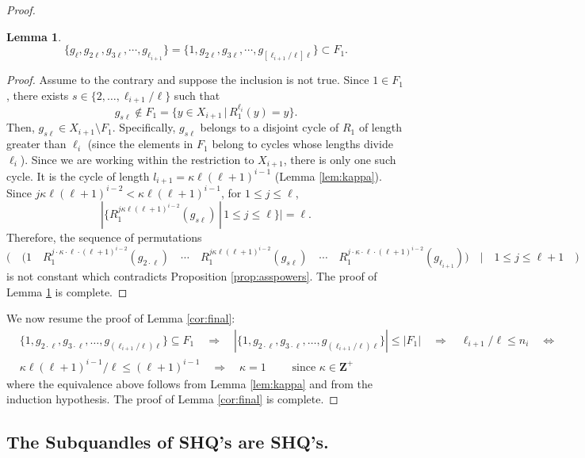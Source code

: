 \documentclass{article}
\newtheorem{lemma}[theorem]{Lemma}
\begin{document}
\begin{proof}
\begin{lemma}\label{lem:GF1}
$$\{ g_{\ell}, g_{2\ell}, g_{3\ell}, \cdots  , g_{\ell_{i+1}}  \} = \{ 1, g_{2\ell}, g_{3\ell}, \cdots , g_{[\ell_{i+1}/\ell]\ell}\}\subset F_1 .$$
\end{lemma}
\begin{proof}
Assume to the contrary and suppose the inclusion is not true. Since $1\in F_1$, there exists $s\in \{ 2, \dots , \ell_{i+1}/\ell \}$ such that $$g_{s\ell}\notin F_1=\{ y\in X_{i+1}\,|\, R_1^{\ell_i}(y)=y \} .$$ Then, $g_{s\ell}\in X_{i+1}\setminus F_1$. Specifically, $g_{s\ell}$ belongs to a disjoint cycle of $R_1$ of length greater than $\ell_i$ (since the elements in $F_1$ belong to cycles whose lengths divide $\ell_i$). Since we are working within the restriction to $X_{i+1}$, there is only one such cycle. It is the cycle of length $l_{i+1}=\kappa \ell (\ell+1)^{i-1}$ (Lemma \ref{lem:kappa}). Since $j\kappa \ell(\ell +1)^{i-2}< \kappa\ell(\ell +1)^{i-1}$, for $1\leq j \leq \ell$, $$|\{ R_1^{j\kappa \ell(\ell +1)^{i-2}}(g_{s\ell})\, |\, 1\leq j \leq \ell \}|=\ell .$$  Therefore, the sequence of permutations $$\Bigg(\quad  \bigg(1\quad R_1^{j\cdot\kappa\cdot\ell\cdot(\ell+1)^{i-2}}(g_{2\cdot\ell})\quad\cdots\quad R_1^{j\kappa \ell(\ell +1)^{i-2}}(g_{s\ell})\quad\cdots\quad R_1^{j\cdot\kappa\cdot\ell\cdot(\ell+1)^{i-2}}(g_{\ell_{i+1}})\bigg)\quad |\quad 1\leq j \leq \ell+1 \quad\Bigg) $$ is not constant which contradicts Proposition \ref{prop:asspowers}. The proof of Lemma \ref{lem:GF1} is complete.

\end{proof}
We now resume the proof of Lemma \ref{cor:final}: \begin{align*}
&\{1,g_{2\cdot\ell},g_{3\cdot\ell},\dots,g_{(\ell_{i+1}/\ell)\ell}\}\subseteq F_1 \quad \Longrightarrow \quad |\{1,g_{2\cdot\ell},g_{3\cdot\ell},\dots,g_{(\ell_{i+1}/\ell)\ell}\}|\leq |F_1| \quad \Longrightarrow \quad \ell_{i+1}/\ell \leq n_i \quad \Longleftrightarrow \quad \\
&\kappa \ell(\ell+1)^{i-1}/\ell \leq (\ell+1)^{i-1} \quad \Longrightarrow \quad \kappa = 1 \qquad \text{ since }\kappa\in\mathbf{Z}^+
\end{align*}
where the equivalence above follows from Lemma \ref{lem:kappa} and from the induction hypothesis. The proof of Lemma \ref{cor:final} is complete.



\end{proof}


\subsection{The Subquandles of SHQ's are SHQ's.}\label{sctn:subquandles}
\end{document}
